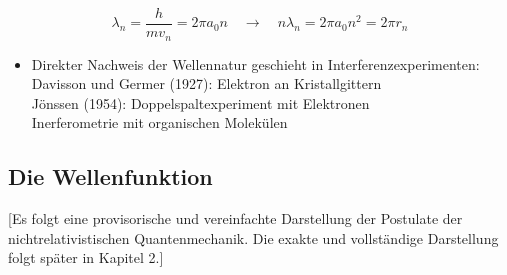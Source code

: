 \begin{equation}
  \lambda_n = \frac{h}{m v_n} = 2\pi a_0 n \quad \rightarrow \quad n \lambda_n = 2\pi a_0 n^2 = 2 \pi r_n
\end{equation}

\begin{itemize}
  \item Direkter Nachweis der Wellennatur geschieht in Interferenzexperimenten:\\
  Davisson und Germer (1927): Elektron an Kristallgittern\\
  Jönssen (1954): Doppelspaltexperiment mit Elektronen\\
  Inerferometrie mit organischen Molekülen
\end{itemize}

\subsection{Die Wellenfunktion}
[Es folgt eine provisorische und vereinfachte Darstellung der Postulate der nichtrelativistischen Quantenmechanik. Die exakte und vollständige Darstellung folgt später in Kapitel 2.]
